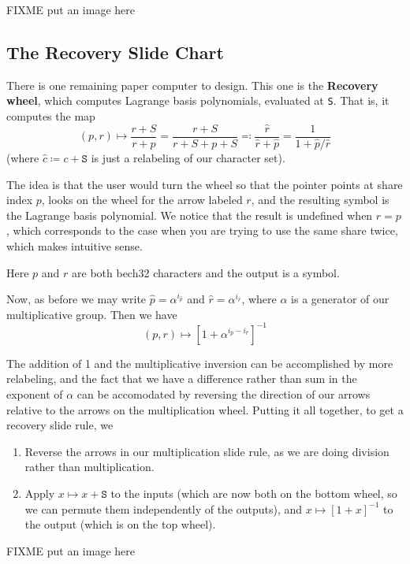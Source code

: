 \documentclass[letterpaper]{article}
\theoremstyle{xxx}
\theoremstyle{evil}
\theoremstyle{yyy}
\theoremstyle{plain}
\theoremstyle{zzz}
\newcommand{\vc}[1]{\texttt{#1}} %
\begin{document}
FIXME put an image here

\subsection{The Recovery Slide Chart}

There is one remaining paper computer to design. This one is the \textbf{Recovery
wheel}, which computes Lagrange basis polynomials, evaluated at \vc{S}. That is,
it computes the map
\[ (p, r) \mapsto \frac{r + S}{r + p} = \frac{r + S}{r + S + p + S} \eqqcolon \frac{\hat{r}}{\hat{r}+\hat{p}} = \frac{1}{1 + \hat{p}/\hat{r}} \]
(where $\hat{c}\coloneqq c+\vc{S}$ is just a relabeling of our character set).

The idea is that the user would turn the wheel so that the pointer points at
share index $p$, looks on the wheel for the arrow labeled $r$, and the resulting
symbol is the Lagrange basis polynomial. We notice that the result is undefined
when $r = p$, which corresponds to the case when you are trying to use the same
share twice, which makes intuitive sense.

Here $p$ and $r$ are both bech32 characters and the output is a symbol.

Now, as before we may write $\hat{p}=\alpha^{i_{\hat{p}}}$ and
$\hat{r}=\alpha^{i_{\hat{r}}}$, where $\alpha$ is a generator of our multiplicative
group. Then we have
\[ (p, r) \mapsto \left[ 1 + \alpha^{i_{\hat{p}} - i_{\hat{r}}} \right]^{-1} \]

The addition of 1 and the multiplicative inversion can be accomplished by more
relabeling, and the fact that we have a difference rather than sum in the exponent
of $\alpha$ can be accomodated by reversing the direction of our arrows relative
to the arrows on the multiplication wheel. Putting it all together, to get a
recovery slide rule, we
\begin{enumerate}
\item Reverse the arrows in our multiplication slide rule, as we are doing
division rather than multiplication.
\item Apply $x\mapsto x+\vc{S}$ to the inputs (which are now both on the bottom
wheel, so we can permute them independently of the outputs), and
$x\mapsto[1+x]^{-1}$ to the output (which is on the top wheel).
\end{enumerate}

FIXME put an image here
\end{document}
